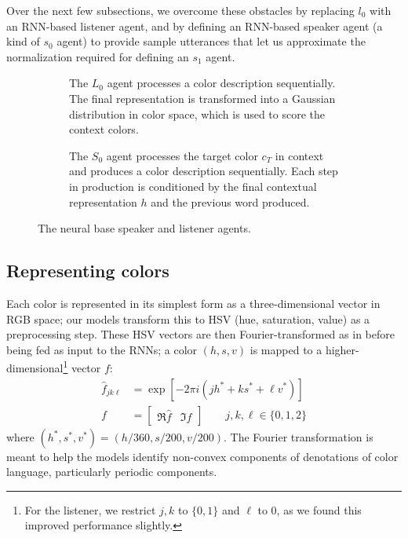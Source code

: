 \documentclass[11pt,letterpaper]{article}
\newcommand{\Listener}{L}
\newcommand{\Speaker}{S}
\newcommand{\feat}{f}
\renewcommand{\|}{\mid}
\begin{document}
Over the next few subsections, we overcome these obstacles by
replacing $l_{0}$ with an RNN-based listener agent, and by defining an
RNN-based speaker agent (a kind of $s_{0}$ agent) to provide sample
utterances that let us approximate the normalization required for
defining an $s_{1}$ agent.

\begin{figure}[t]
  \centering
   \begin{subfigure}[b]{0.48\textwidth}
    \centering
    
    \caption{The $\Listener_{0}$ agent processes a color description
      sequentially. The final representation is transformed into a
      Gaussian distribution in color space, which is used to score the
      context colors.}
    \label{fig:model:listener}
  \end{subfigure}
  \hfill
  \begin{subfigure}[b]{0.48\textwidth}
    \centering
    
    \caption{The $\Speaker_{0}$ agent processes the target color
      $c_{T}$ in context and produces a color description
      sequentially. Each step in production is conditioned by the
      final contextual representation $h$ and the previous word
      produced.}
    \label{fig:model:speaker}
  \end{subfigure}
  \caption{The neural base speaker and listener agents.}
  \label{fig:model}
\end{figure}

\subsection{Representing colors}

Each color is represented in its simplest form as a three-dimensional vector in
RGB space; our models transform this to HSV (hue, saturation,
value) as a preprocessing step. These HSV vectors are then Fourier-transformed as in  before being fed as input to the RNNs;
a color
$(h, s, v)$ is mapped to a higher-dimensional\footnote{For the listener, we restrict $j,k$ to $\{0, 1\}$ and $\ell$ to 0, as we
found this improved performance slightly.} vector $\feat$:
\begin{align*}
\hat{\feat}_{jk\ell} &= \exp \left[-2\pi i \left(jh^* + ks^* + \ell v^*\right)\right] \\
\feat &= \begin{bmatrix}
  \Re{\hat{\feat}} & \Im{\hat{\feat}}
\end{bmatrix}\qquad j,k,\ell \in \{0,1,2\}
\end{align*}
where $(h^*, s^*, v^*) = (h / 360, s / 200, v/200)$.
The Fourier transformation is meant to help the models identify non-convex components
of denotations of color language, particularly periodic components.
\end{document}
